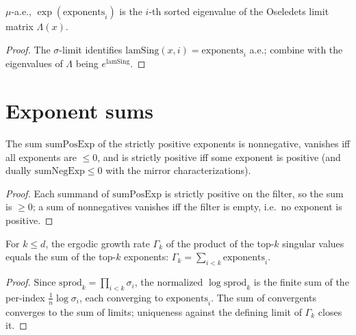 \begin{theorem}\label{exp_exponents_eq_eigenvalues₀_oseledetsLimit}
  \leanok
  $\mu$-a.e., $\exp(\mathrm{exponents}_i)$ is the $i$-th sorted eigenvalue of the Oseledets limit matrix $\Lambda(x)$.
\end{theorem}
\begin{proof}\leanok
  The $\sigma$-limit identifies $\mathrm{lamSing}(x,i) = \mathrm{exponents}_i$ a.e.; combine with the eigenvalues of $\Lambda$ being $e^{\mathrm{lamSing}}$.
\end{proof}

\section{Exponent sums}

\begin{theorem}\label{sumPosExp_pos_iff}
  \leanok
  The sum $\mathrm{sumPosExp}$ of the strictly positive exponents is nonnegative, vanishes iff all exponents are $\le 0$, and is strictly positive iff some exponent is positive (and dually $\mathrm{sumNegExp} \le 0$ with the mirror characterizations).
\end{theorem}
\begin{proof}\leanok
  Each summand of $\mathrm{sumPosExp}$ is strictly positive on the filter, so the sum is $\ge 0$; a sum of nonnegatives vanishes iff the filter is empty, i.e.\ no exponent is positive.
\end{proof}

\begin{theorem}\label{gammaK_eq_sum_top_exponents}
  \leanok
  For $k \le d$, the ergodic growth rate $\Gamma_k$ of the product of the top-$k$ singular values equals the sum of the top-$k$ exponents: $\Gamma_k = \sum_{i<k} \mathrm{exponents}_i$.
\end{theorem}
\begin{proof}\leanok
  Since $\mathrm{sprod}_k = \prod_{i<k}\sigma_i$, the normalized $\log\mathrm{sprod}_k$ is the finite sum of the per-index $\tfrac1n\log\sigma_i$, each converging to $\mathrm{exponents}_i$. The sum of convergents converges to the sum of limits; uniqueness against the defining limit of $\Gamma_k$ closes it.
\end{proof}

